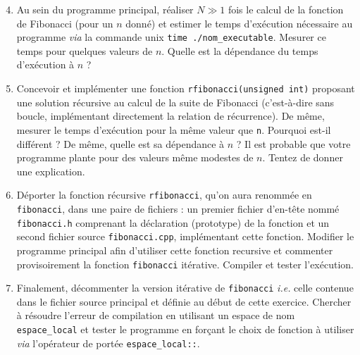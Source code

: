 \documentclass{book}
\newcommand{\inline}[1]{\texttt{#1}}
\begin{document}
\begin{enumerate}
\setcounter{enumi}{3}
\item Au sein du programme principal, réaliser \(N\gg1\) fois le calcul de la fonction de Fibonacci (pour un $n$ donné) et estimer le temps d'exécution nécessaire au programme \emph{via} la commande unix \texttt{time ./nom\_executable}. Mesurer ce temps pour quelques valeurs de $n$. Quelle est la dépendance du temps d'exécution à $n$ ?

\item Concevoir et implémenter une fonction \inline{rfibonacci(unsigned int)} proposant une solution récursive au calcul de la suite de Fibonacci (c'est-à-dire sans boucle, implémentant directement la relation de récurrence). De même, mesurer le temps d'exécution pour la même valeur que \texttt{n}. Pourquoi est-il différent ? De même, quelle est sa dépendance à $n$ ? Il est probable que votre programme plante pour des valeurs même modestes de $n$. Tentez de donner une explication.
  
\item Déporter la fonction récursive \texttt{rfibonacci}, qu'on aura renommée en \texttt{fibonacci}, dans une paire de fichiers : un premier fichier d'en-tête nommé \texttt{fibonacci.h} comprenant la déclaration (prototype) de la fonction et un second fichier source \texttt{fibonacci.cpp}, implémentant cette fonction. Modifier le programme principal afin d'utiliser cette fonction recursive et commenter provisoirement la fonction \texttt{fibonacci} itérative. Compiler et tester l'exécution.

\item Finalement, décommenter la version itérative de \texttt{fibonacci} \emph{i.e.} celle contenue dans le fichier source principal et définie au début de cette exercice. Chercher à résoudre l'erreur de compilation en utilisant un espace de nom \inline{espace_local} et tester le programme en forçant le choix de fonction à utiliser \emph{via} l'opérateur de portée \inline{espace_local::}.
\end{enumerate}
\end{document}
